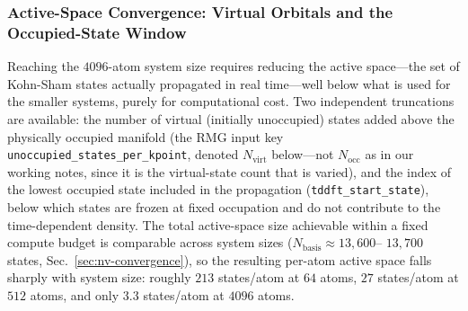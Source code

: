 \begin{figure}[ht!]
  \caption{\footnotesize {}}
  \label{fig:nv}
\end{figure}

\subsubsection{Active-Space Convergence: Virtual Orbitals and the Occupied-State Window}
\label{sec:nv-active-space}

Reaching the $4096$-atom system size requires reducing the active
space---the set of Kohn-Sham states actually propagated in real
time---well below what is used for the smaller systems, purely for
computational cost. Two independent truncations are available: the
number of virtual (initially unoccupied) states added above the
physically occupied manifold (the RMG input key
\texttt{unoccupied\_states\_per\_kpoint}, denoted $N_{\mathrm{virt}}$
below---not $N_{\mathrm{occ}}$ as in our working notes, since it is the
virtual-state count that is varied), and the index of the lowest
occupied state included in the propagation
(\texttt{tddft\_start\_state}), below which states are frozen at fixed
occupation and do not contribute to the time-dependent density. The
total active-space size achievable within a fixed compute budget is
comparable across system sizes ($N_{\mathrm{basis}}\approx13{,}600$--
$13{,}700$ states, Sec.~\ref{sec:nv-convergence}), so the resulting
per-atom active space falls sharply with system size: roughly $213$
states/atom at $64$ atoms, $27$ states/atom at $512$ atoms, and only
$3.3$ states/atom at $4096$ atoms.

